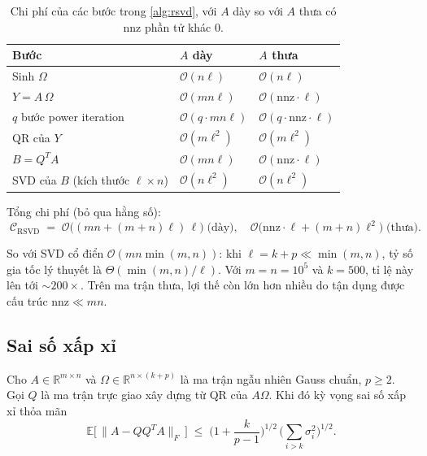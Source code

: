 \begin{table}[ht]
\centering
\caption{Chi phí của các bước trong \cref{alg:rsvd}, với
$A$ dày so với $A$ thưa có $\mathrm{nnz}$ phần tử khác $0$.}
\label{tab:complexity}
\begin{tabular}{lll}
\toprule
\textbf{Bước} & \textbf{$A$ dày} & \textbf{$A$ thưa} \\
\midrule
Sinh $\Omega$              & $\mathcal{O}(n\ell)$
                           & $\mathcal{O}(n\ell)$ \\
$Y = A\,\Omega$            & $\mathcal{O}(mn\ell)$
                           & $\mathcal{O}(\mathrm{nnz}\cdot\ell)$ \\
$q$ bước power iteration   & $\mathcal{O}(q\cdot mn\ell)$
                           & $\mathcal{O}(q\cdot \mathrm{nnz}\cdot\ell)$ \\
QR của $Y$                 & $\mathcal{O}(m\ell^2)$
                           & $\mathcal{O}(m\ell^2)$ \\
$B = Q^T A$                & $\mathcal{O}(mn\ell)$
                           & $\mathcal{O}(\mathrm{nnz}\cdot\ell)$ \\
SVD của $B$ (kích thước $\ell\times n$) & $\mathcal{O}(n\ell^2)$
                                        & $\mathcal{O}(n\ell^2)$ \\
\bottomrule
\end{tabular}
\end{table}

Tổng chi phí (bỏ qua hằng số):
\begin{equation}\label{eq:rsvd-cost}
\boxed{\;\mathcal{C}_{\mathrm{RSVD}} \;=\;
    \mathcal{O}\bigl((mn + (m + n)\ell)\,\ell\bigr)
\;\text{(dày)},
\quad
    \mathcal{O}\bigl(\mathrm{nnz}\cdot\ell + (m+n)\ell^2\bigr)
\;\text{(thưa)}.}
\end{equation}

So với SVD cổ điển $\mathcal{O}(mn\min(m,n))$: khi $\ell = k + p \ll \min(m, n)$,
tỷ số gia tốc lý thuyết là $\Theta(\min(m,n)/\ell)$. Với $m = n = 10^5$ và
$k = 500$, tỉ lệ này lên tới $\sim 200\times$. Trên ma trận thưa, lợi thế còn
lớn hơn nhiều do tận dụng được cấu trúc $\mathrm{nnz} \ll mn$.

\subsection{Sai số xấp xỉ}\label{subsec:error-bound}

\begin{theorem}\label{thm:hmt-bound}
Cho $A \in \mathbb{R}^{m\times n}$ và $\Omega \in \mathbb{R}^{n\times (k+p)}$
là ma trận ngẫu nhiên Gauss chuẩn, $p \ge 2$. Gọi $Q$ là ma trận trực giao
xây dựng từ QR của $A\Omega$. Khi đó kỳ vọng sai số xấp xỉ thỏa mãn
\begin{equation}\label{eq:hmt-bound}
    \mathbb{E}\bigl[\, \|A - Q Q^T A\|_F\,\bigr]
       \;\le\; \biggl(1 + \frac{k}{p - 1}\biggr)^{1/2}\,
               \biggl(\sum_{i > k}\sigma_i^2\biggr)^{1/2}.
\end{equation}
\end{theorem}

